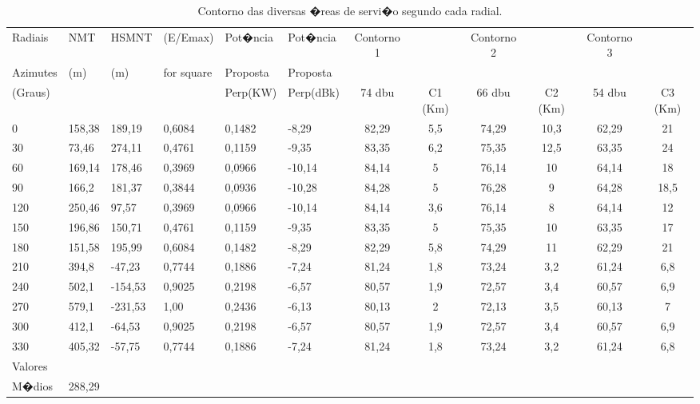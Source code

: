 \begin{center}
\def\tablename{Tabela}
\begin{table}
\centering
\vspace*{0.05cm}
\begin{sideways}
\begin{tabular}{|l|l|l|l|l|l|cc|cc|cc|} \hline

Radiais&NMT&HSMNT&(E/Emax)&Pot�ncia&Pot�ncia&Contorno 1&&Contorno 2&&Contorno 3&\\ \cline{7-12}
Azimutes&(m)&(m)&for square&Proposta&Proposta&&&&&&\\     
(Graus)&&&&Perp(KW)&Perp(dBk)&74 dbu&C1 (Km)&66 dbu&C2 (Km)&54 dbu&C3 (Km)\\ \hline
0&158,38&189,19&0,6084&0,1482&-8,29&82,29&5,5&74,29&10,3&62,29&21\\
30&73,46&274,11&0,4761&0,1159&-9,35&83,35&6,2&75,35&12,5&63,35&24\\
60&169,14&178,46&0,3969&0,0966&-10,14&84,14&5&76,14&10&64,14&18\\
90&166,2&181,37&0,3844&0,0936&-10,28&84,28&5&76,28&9&64,28&18,5\\
120&250,46&97,57&0,3969&0,0966&-10,14&84,14&3,6&76,14&8&64,14&12\\
150&196,86&150,71&0,4761&0,1159&-9,35&83,35&5&75,35&10&63,35&17\\
180&151,58&195,99&0,6084&0,1482&-8,29&82,29&5,8&74,29&11&62,29&21\\
210&394,8&-47,23&0,7744&0,1886&-7,24&81,24&1,8&73,24&3,2&61,24&6,8\\
240&502,1&-154,53&0,9025&0,2198&-6,57&80,57&1,9&72,57&3,4&60,57&6,9\\
270&579,1&-231,53&1,00&0,2436&-6,13&80,13&2&72,13&3,5&60,13&7\\
300&412,1&-64,53&0,9025&0,2198&-6,57&80,57&1,9&72,57&3,4&60,57&6,9\\
330&405,32&-57,75&0,7744&0,1886&-7,24&81,24&1,8&73,24&3,2&61,24&6,8\\ \hline
Valores&&&&&&&&&&&\\
M�dios &288,29&&&&&&&&&&\\\hline



\end{tabular}
\end{sideways}
\caption{ Contorno das diversas �reas de servi�o segundo cada radial. }
\label{tabelaGeral}
\end{table}
\end{center}

